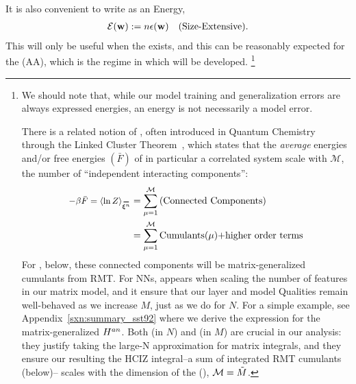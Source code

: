 It is also convenient to write \emph{\TotalEffectivePotential} as an Energy, 
\begin{align}
 \label{eqn:detox}
 \mathcal{E}(\mathbf{w}) := n\epsilon({\mathbf{w}})\quad \text{(Size-Extensive)}.
\end{align}
This will only be useful when the \ThermodynamicLimit exists, and this
can be reasonably expected for the \AnnealedApproximation (AA),
which is the regime in which \SETOL will be developed.%
\footnote{We should note that, while our model training and generalization errors are always expressed energies, an energy is not necessarily a model error. 

There is a related notion of \emph{\SizeConsistency},
often introduced in Quantum Chemistry through the Linked Cluster Theorem~\cite{Hubbard1959,Brandow1963},
which states that the \emph{average} energies and/or free energies $(\bar{F})$ of in particular a correlated system scale with $\mathcal{M}$,
the number of ``independent interacting components'':
\begin{align}
  \label{eqn:LCT}
  -\beta \bar{F}=\langle \ln Z \rangle_{\AVGNDXIn} &= \sum_{\mu=1}^{\mathcal{M}}\text{(Connected Components)} \\ \nonumber
  &= \sum_{\mu=1}^{\mathcal{M}}\text{Cumulants($\mu$)+higher order terms} 
\end{align}
For \SETOL, below, these connected components will be matrix-generalized cumulants from RMT.
For NNs, \SizeConsistency appears when scaling the number of features in our matrix model,
and it ensure that our layer and model Qualities  remain well-behaved as we increase $M$, just as we do for $N$.
For a simple example, see Appendix~\ref{sxn:summary_sst92}
 where we derive the expression for the matrix-generalized
\AnnealedHamiltonian $H^{an}$.  
Both \SizeExtensivity (in $N$) and \SizeConsistency (in $M$)
are crucial in our \SETOL analysis:  they justify taking the large-N approximation for matrix integrals, and they ensure
our resulting the HCIZ integral--a sum of integrated RMT cumulants (below)--
scales with the dimension of the \EffectiveCorrelationSpace (\ECS), $\mathcal{M}=\tilde{M}$.


}
